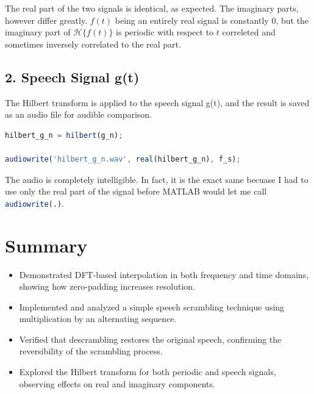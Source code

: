 \documentclass[12pt]{article}
\begin{document}
The real part of the two signals is identical, as expected.
The imaginary parts, however differ greatly. $f(t)$ being an entirely real signal is constantly $0$, but the imaginary part of $\mathcal{H}\{f(t)\}$ is periodic with respect to $t$ correleted and sometimes inversely correlated to the real part.


\newpage
\subsection*{2. Speech Signal g(t)}
The Hilbert transform is applied to the speech signal g(t), and the result is saved as an audio file for audible comparison.

\begin{lstlisting}[language=Octave, caption=Hilbert Transform of $g(n)$]
hilbert_g_n = hilbert(g_n);

audiowrite('hilbert_g_n.wav', real(hilbert_g_n), f_s);
\end{lstlisting}

The audio is completely intelligible. In fact, it is the exact same becuase I had to use only the real part of the signal before MATLAB would let me call \lstinline[language=Octave]|audiowrite(.)|.

\newpage
\section*{Summary}
\begin{itemize}
    \item Demonstrated DFT-based interpolation in both frequency and time domains, showing how zero-padding increases resolution.
    \item Implemented and analyzed a simple speech scrambling technique using multiplication by an alternating sequence.
    \item Verified that descrambling restores the original speech, confirming the reversibility of the scrambling process.
    \item Explored the Hilbert transform for both periodic and speech signals, observing effects on real and imaginary components.
\end{itemize}
\end{document}
